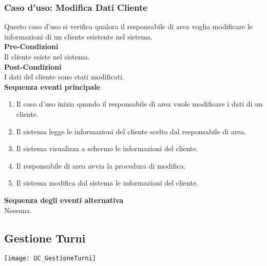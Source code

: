 \documentclass[green, fancy, 11pt]{elegantbook}
\begin{document}
\subsubsection{Caso d'uso: Modifica Dati Cliente}
\noindent
Questo caso d’uso si verifica qualora il responsabile di area voglia modificare le informazioni di un cliente esistente nel sistema.\\
\textbf{Pre-Condizioni}\\
Il cliente esiste nel sistema.\\
\textbf{Post-Condizioni}\\
I dati del cliente sono stati modificati.\\
\textbf{Sequenza eventi principale}
\begin{enumerate}
	\item Il caso d’uso inizia quando il responsabile di area vuole modificare i dati di un cliente.
	\item Il sistema legge le informazioni del cliente scelto dal responsabile di area.
	\item Il sistema visualizza a schermo le informazioni del cliente.
	\item Il responsabile di area avvia la procedura di modifica.
	\item Il sistema modifica dal sistema le informazioni del cliente.
\end{enumerate}
\textbf{Sequenza degli eventi alternativa}\\
Nessuna.
\newpage


\subsection{Gestione Turni}
\texttt{[image: UC\_GestioneTurni]}
\end{document}
